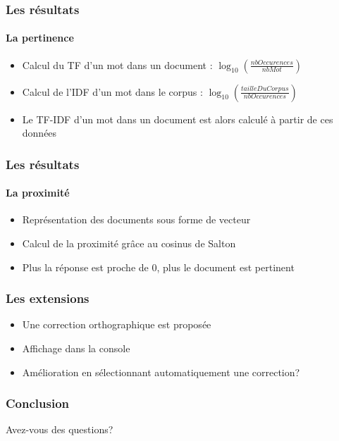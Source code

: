 \documentclass{beamer}
\begin{document}
\begin{frame}

\frametitle{Les r\'esultats}
\framesubtitle{La pertinence}

\begin{itemize}
 \item Calcul du TF d'un mot dans un document : $ \log_{10}(\frac{nbOccurences}{nbMot}) $
 \item Calcul de l'IDF d'un mot dans le corpus : $ \log_{10}(\frac{tailleDuCorpus}{nbOccurences}) $
 \item Le TF-IDF d'un mot dans un document est alors calcul\'e \`a partir de ces donn\'ees
\end{itemize}

 
\end{frame}

\begin{frame}

\frametitle{Les r\'esultats}
\framesubtitle{La proximit\'e}

\begin{itemize}
 \item Repr\'esentation des documents sous forme de vecteur
 \item Calcul de la proximit\'e gr\^ace au cosinus de Salton
 \item Plus la r\'eponse est proche de 0, plus le document est pertinent
\end{itemize}

 
\end{frame}

\begin{frame}

\frametitle{Les extensions}

\begin{itemize}
 \item Une correction orthographique est propos\'ee
 \item Affichage dans la console
 \item Am\'elioration en s\'electionnant automatiquement une correction?
\end{itemize}

 
\end{frame}

\begin{frame}
 \frametitle{Conclusion}
 
 Avez-vous des questions?
 
\end{frame}
\end{document}
